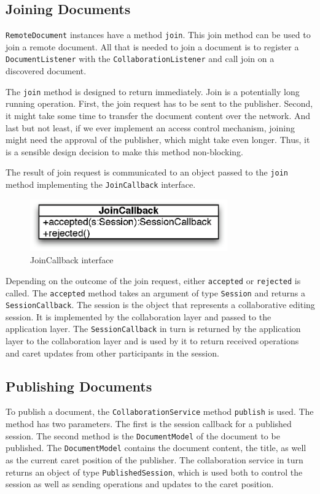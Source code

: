 \subsection{Joining Documents}
\texttt{RemoteDocument} instances have a method \texttt{join}. This join
method can be used to join a remote document. All that is needed to
join a document is to register a \texttt{DocumentListener} with the 
\texttt{CollaborationListener} and call join on a discovered document.

The \texttt{join} method is designed to return immediately. Join is a 
potentially long running operation. First, the join request has to be sent
to the publisher. Second, it might take some time to transfer the document
content over the network. And last but not least, if we ever implement
an access control mechanism, joining might need the approval of the publisher,
which might take even longer. Thus, it is a sensible design decision to
make this method non-blocking.

The result of join request is communicated to an object passed to the
\texttt{join} method implementing the \texttt{JoinCallback} interface.

\begin{figure}[H]
 \centering
 \includegraphics[width=8.5cm,height=2.25cm]{../images/design/collaboration-join.eps}
 \caption{JoinCallback interface}
\end{figure}

Depending on the outcome of the join request, either \texttt{accepted} or
\texttt{rejected} is called. The \texttt{accepted} method takes an argument
of type \texttt{Session} and returns a \texttt{SessionCallback}. The session
is the object that represents a collaborative editing session. It is
implemented by the collaboration layer and passed to the application layer.
The \texttt{SessionCallback} in turn is returned by the application layer
to the collaboration layer and is used by it to return received operations
and caret updates from other participants in the session.

\subsection{Publishing Documents}
To publish a document, the \texttt{CollaborationService} method \texttt{publish}
is used. The method has two parameters. The first is the session callback
for a published session. The second method is the \texttt{DocumentModel}
of the document to be published. The \texttt{DocumentModel} contains the
document content, the title, as well as the current caret position of the
publisher. The collaboration service in turn returns an object of type
\texttt{PublishedSession}, which is used both to control the session as well
as sending operations and updates to the caret position.

